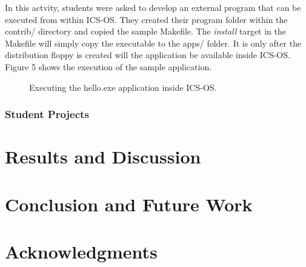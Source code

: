 \documentclass{acm_proc_article-sp}
\begin{document}
In this actvity, students were asked to develop an external program that can 
be executed from within ICS-OS. They created their program folder within
the contrib/ directory and copied the sample Makefile. The \textit{install}
target in the Makefile will simply copy the executable to the apps/ folder.
It is only after the distribution floppy is created will the application be
available inside ICS-OS. Figure 5 shows the execution of the sample 
application.

\begin{figure}
\centering
{}
\caption{Executing the hello.exe application inside ICS-OS.}
\end{figure}
 

\subsubsection{Student Projects}

\section{Results and Discussion}

\section{Conclusion and Future Work}

\section{Acknowledgments}




\balancecolumns
\end{document}
